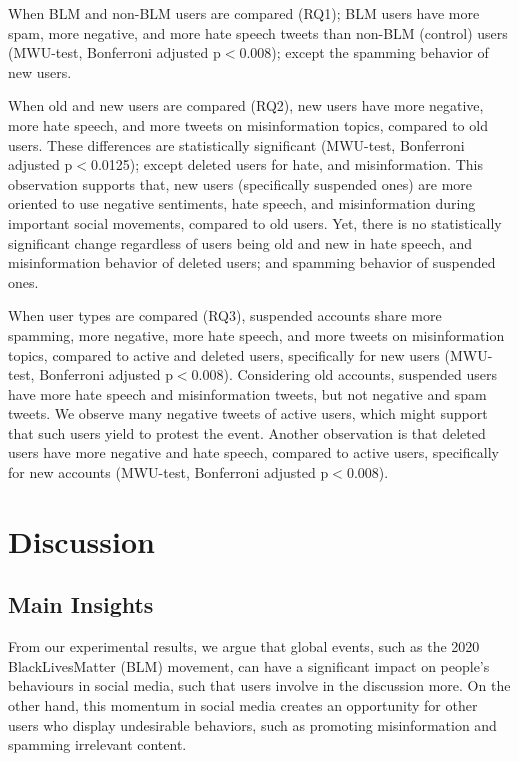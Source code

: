 \documentclass[sigconf]{acmart}
\begin{document}
When BLM and non-BLM users are compared (RQ1); BLM users have more spam, more negative, and more hate speech tweets than non-BLM (control) users (MWU-test, Bonferroni adjusted p$<$0.008); except the spamming behavior of new users. 

When old and new users are compared (RQ2), new users have more negative, more hate speech, and more tweets on misinformation topics, compared to old users. These differences are statistically significant (MWU-test, Bonferroni adjusted p$<$0.0125); except deleted users for hate, and misinformation. This observation supports that, new users (specifically suspended ones) are more oriented to use negative sentiments, hate speech, and misinformation during important social movements, compared to old users. Yet, there is no statistically significant change regardless of users being old and new in hate speech, and misinformation behavior of deleted users; and spamming behavior of suspended ones.

When user types are compared (RQ3), suspended accounts share more spamming, more negative, more hate speech, and more tweets on misinformation topics, compared to active and deleted users, specifically for new users (MWU-test, Bonferroni adjusted p$<$0.008). Considering old accounts, suspended users have more hate speech and misinformation tweets, but not negative and spam tweets. We observe many negative tweets of active users, which might support that such users yield to protest the event. Another observation is that deleted users have more negative and hate speech, compared to active users, specifically for new accounts (MWU-test, Bonferroni adjusted p$<$0.008).


\section{Discussion}
\label{section:discussion}

\subsection{Main Insights}
From our experimental results, we argue that global events, such as the 2020 BlackLivesMatter (BLM) movement, can have a significant impact on people's behaviours in social media, such that users involve in the discussion more. On the other hand, this momentum in social media creates an opportunity for other users who display undesirable behaviors, such as promoting misinformation and spamming irrelevant content. 
\end{document}
